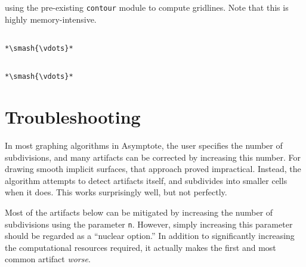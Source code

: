 \documentclass{article}
\begin{document}
using the pre-existing \lstinline!contour! module to compute gridlines.
Note that this is highly memory-intensive.
\begin{lstlisting}[escapechar=*]

*\smash{\vdots}*
\end{lstlisting}
\vspace*{-\baselineskip}

\vspace*{-\baselineskip}
\begin{lstlisting}[escapechar=*]

*\smash{\vdots}*
\end{lstlisting}
\vspace*{-\baselineskip}


\section{Troubleshooting}
In most graphing algorithms in Asymptote, the user specifies the number of 
subdivisions, and many artifacts can be corrected by increasing this number.
For drawing smooth implicit surfaces, that approach proved impractical.
Instead, the algorithm  
attempts to detect artifacts itself, and subdivides into
smaller cells when it does.
This works surprisingly well, but not perfectly.

Most of the artifacts below can be mitigated by increasing 
the number of subdivisions using the parameter \lstinline!n!. 
However, simply increasing this parameter
should be regarded as a ``nuclear option.'' In addition to 
significantly increasing the computational resources required, 
it actually makes the first and most common artifact \emph{worse}.
%
\end{document}
